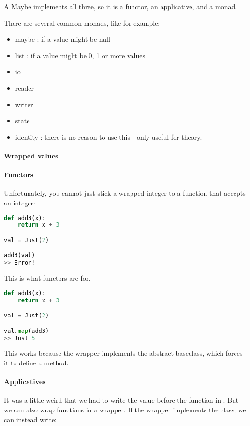 A Maybe implements all three, so it is a functor, an applicative, and a monad.

There are several common monads, like for example: 

\begin{itemize}
    \item maybe : if a value might be null
    \item list : if a value might be 0, 1 or more values
    \item io
    \item reader
    \item writer
    \item state
    \item identity : there is no reason to use this - only useful for theory.
\end{itemize}

\paragraph{Wrapped values}

\paragraph{Functors} Unfortunately, you cannot just stick a wrapped integer to a function that accepts an integer: 
\begin{lstlisting}[language=python]
def add3(x):
    return x + 3

val = Just(2)

add3(val) 
>> Error!
\end{lstlisting}

This is what functors are for. 
\begin{lstlisting}[language=python]
def add3(x):
    return x + 3

val = Just(2)

val.map(add3)
>> Just 5
\end{lstlisting}

This works because the  wrapper implements the abstract  baseclass, which forces it to define a  method. 


\paragraph{Applicatives} It was a little weird that we had to write the value before the function in . But we can also wrap functions in a wrapper. If the wrapper implements the  class, we can instead write:

